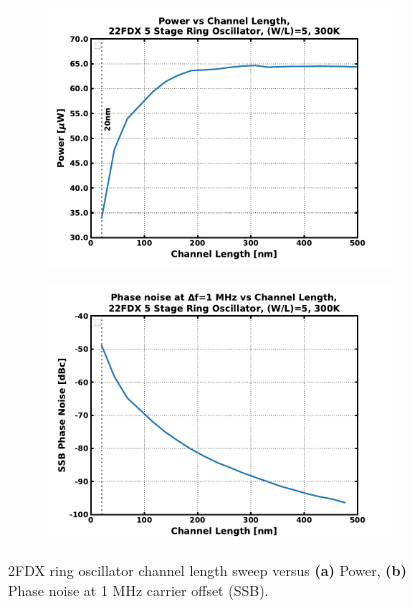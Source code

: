 		\begin{figure}[htb!]
		    \centering
		    \begin{subfigure}{0.5\textwidth}
		        \centering
		        \includegraphics[width=1\textwidth, angle=0]{./figs/design/22fdx_rosc_power}
		        \caption{ }
		        \label{fig:rosc_power}
		    \end{subfigure}%
		    \begin{subfigure}{0.5\textwidth}
		        \centering
		        \includegraphics[width=1\textwidth, angle=0]{./figs/design/22fdx_rosc_pn_1mhz}
		        \caption{ }
		        \label{fig:rosc_groupb}
		    \end{subfigure}
		    \label{fig:rosc_pn}
		    \caption{2FDX ring oscillator channel length sweep versus \textbf{(a)} Power, \textbf{(b)} Phase noise at 1 MHz carrier offset (SSB).}
		\end{figure} 



